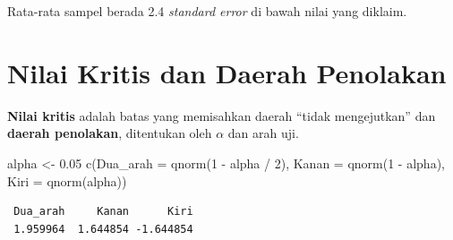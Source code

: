 \documentclass[
  indonesian,
  letterpaper,
]{book}
\newenvironment{Shaded}{\begin{snugshade}}{\end{snugshade}}
\newcommand{\AttributeTok}[1]{\textcolor[rgb]{0.40,0.45,0.13}{#1}}
\newcommand{\DecValTok}[1]{\textcolor[rgb]{0.68,0.00,0.00}{#1}}
\newcommand{\FloatTok}[1]{\textcolor[rgb]{0.68,0.00,0.00}{#1}}
\newcommand{\FunctionTok}[1]{\textcolor[rgb]{0.28,0.35,0.67}{#1}}
\newcommand{\NormalTok}[1]{\textcolor[rgb]{0.00,0.23,0.31}{#1}}
\newcommand{\OtherTok}[1]{\textcolor[rgb]{0.00,0.23,0.31}{#1}}
\newcommand{\SpecialCharTok}[1]{\textcolor[rgb]{0.37,0.37,0.37}{#1}}
\begin{document}
Rata-rata sampel berada 2.4 \emph{standard error} di bawah nilai yang
diklaim.

\section{Nilai Kritis dan Daerah
Penolakan}\label{nilai-kritis-dan-daerah-penolakan}

\textbf{Nilai kritis} adalah batas yang memisahkan daerah ``tidak
mengejutkan'' dan \textbf{daerah penolakan}, ditentukan oleh \(\alpha\)
dan arah uji.

\begin{Shaded}
\begin{Highlighting}[]
\NormalTok{alpha }\OtherTok{\textless{}{-}} \FloatTok{0.05}
\FunctionTok{c}\NormalTok{(}\AttributeTok{Dua\_arah =} \FunctionTok{qnorm}\NormalTok{(}\DecValTok{1} \SpecialCharTok{{-}}\NormalTok{ alpha }\SpecialCharTok{/} \DecValTok{2}\NormalTok{), }\AttributeTok{Kanan =} \FunctionTok{qnorm}\NormalTok{(}\DecValTok{1} \SpecialCharTok{{-}}\NormalTok{ alpha), }\AttributeTok{Kiri =} \FunctionTok{qnorm}\NormalTok{(alpha))}
\end{Highlighting}
\end{Shaded}

\begin{verbatim}
 Dua_arah     Kanan      Kiri 
 1.959964  1.644854 -1.644854 
\end{verbatim}
\end{document}
